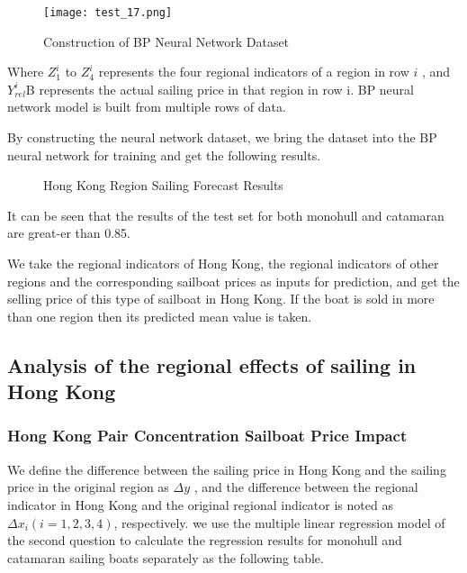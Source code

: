 \begin{figure}[H]  %
    \centering  %
    \texttt{[image: test\_17.png]} %
    \caption{Construction of BP Neural Network Dataset} %
\end{figure}
\vspace{-0.5cm}
Where $Z_1^i$ to $Z_4^i$ represents the four regional indicators of a region in row $i$ , and $Y_{rel}^i$B represents the actual sailing price in that region in row i. BP neural network model is built from multiple rows of data.

By constructing the neural network dataset, we bring the dataset into the BP neural network for training and get the following results.

\vspace{-0.5cm}
\begin{figure}[H]
    \centering    
	\caption{Hong Kong Region Sailing Forecast Results} %
\end{figure}
\vspace{-0.5cm} %
It can be seen that the results of the test set for both monohull and catamaran are great-er than 0.85.

We take the regional indicators of Hong Kong, the regional indicators of other regions and the corresponding sailboat prices as inputs for prediction, and get the selling price of this type of sailboat in Hong Kong. If the boat is sold in more than one region then its predicted mean value is taken.

\subsection{Analysis of the regional effects of sailing in Hong Kong}
\subsubsection{Hong Kong Pair Concentration Sailboat Price Impact}

We define the difference between the sailing price in Hong Kong and the sailing price in the original region as $\Delta y$ , and the difference between the regional indicator in Hong Kong and the original regional indicator is noted as $\Delta x_i (i=1,2,3,4)$, respectively. we use the multiple linear regression model of the second question to calculate the regression results for monohull and catamaran sailing boats separately as the following table.

